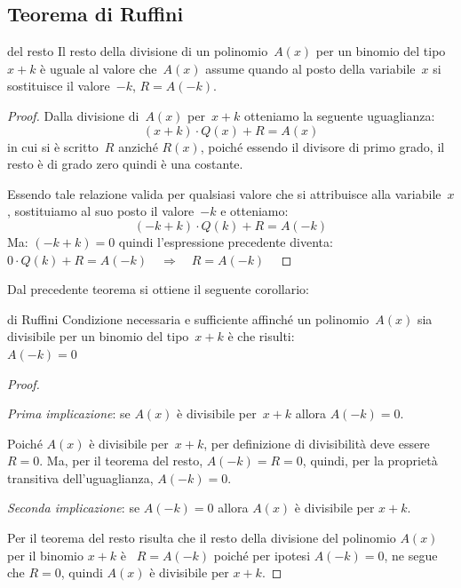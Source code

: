 \subsection{Teorema di Ruffini}
\label{subsec:divpol_teorema_ruffini}

\begin{teorema}{del resto}{}
Il resto della divisione di un polinomio~\(A(x)\) per un
binomio del tipo~\(x+k\) è uguale al valore che~\(A(x)\) assume quando
al posto della variabile~\(x\) si sostituisce il valore~\(-k\), 
\(R=A(-k)\).
\end{teorema}

\begin{proof}{}{}
Dalla divisione di~\(A(x)\) per~\(x+k\) otteniamo la seguente
uguaglianza:
\[(x+k)\cdot Q(x)+R=A(x)\]
in cui si è scritto~\(R\) anziché \(R(x)\), poiché essendo il divisore 
di primo grado, il resto è di grado zero quindi è una costante.

Essendo tale relazione valida per qualsiasi valore che si attribuisce
alla variabile~\(x\), sostituiamo al suo posto il valore~\(-k\) e 
otteniamo:
\[(-k+k) \cdot Q(k)+R=A(-k)\]
Ma: \((-k+k)=0\) quindi l'espressione precedente diventa:\\[.5em]
\phantom{.}\hfill 
\(0 \cdot Q(k)+R=A(-k) \quad \Longrightarrow \quad R=A(-k)\) \hfill ~
\end{proof}

Dal precedente teorema si ottiene il seguente corollario:

\begin{teorema}{di Ruffini}{}
Condizione necessaria e sufficiente affinché un polinomio~\(A(x)\) 
sia divisibile per un binomio del tipo~\(x+k\) è
che risulti: \\
\phantom{.}\hfill \(A(-k)=0\) \hfill ~
\end{teorema}

\begin{proof}{}{}
~

\emph{Prima implicazione}: \quad se \(A(x)\) è divisibile 
per~\(x+k\) \quad allora \quad \(A(-k)=0\).

Poiché \(A(x)\) è divisibile per~\(x+k\), per definizione di 
divisibilità deve essere \(R=0\). 
Ma, per il teorema del resto, \(A(-k)=R=0\), 
quindi, per la proprietà transitiva dell'uguaglianza, \(A(-k)=0\).

\noindent \emph{Seconda implicazione}: \quad se \(A(-k)=0\) \quad 
allora \quad \(A(x)\) è divisibile per \(x+k\).

Per il teorema del resto risulta che il resto della divisione del 
polinomio \(A(x)\) per il binomio \(x+k\) è ~\(R=A(-k)\) poiché per 
ipotesi \(A(-k)=0\), ne segue che \(R=0\), quindi \(A(x)\) è divisibile 
per \(x+k\).
\end{proof}

